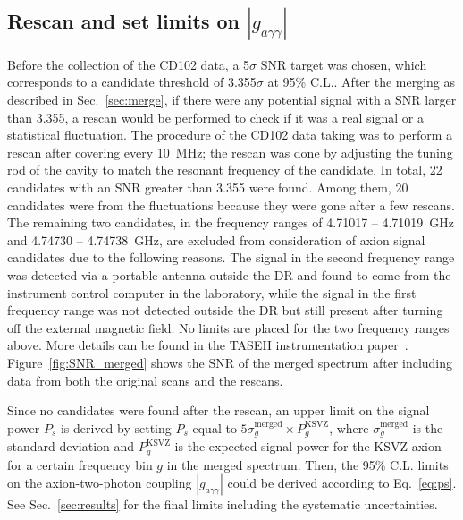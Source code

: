 \documentclass[%
reprint, %
superscriptaddress,
 amsmath,amssymb,
 aps
]{revtex4-2}
\begin{document}
\subsection{Rescan and set limits on $\left|g_{a\gamma\gamma}\right|$}
\label{sec:rescan} 
Before the collection of the CD102 data, a 5$\sigma$ SNR target was chosen, 
which corresponds to a candidate threshold of 3.355$\sigma$ at 95\% C.L..
 After the merging as described in Sec.~\ref{sec:merge}, if there were 
any potential signal with a SNR larger than 
3.355, a rescan would be performed to check if it was a real signal 
or a statistical fluctuation. 
The procedure of the CD102 data taking was to perform a rescan after 
covering every 10~MHz; the rescan was done by adjusting the tuning rod of the 
cavity to match the resonant frequency of the candidate. 
In total, 22 candidates with an SNR greater than 3.355 were found. 
Among them, 20 candidates were from the fluctuations because they were gone 
after a few rescans. The remaining two candidates, 
in the frequency ranges of 4.71017 -- 4.71019~GHz and 4.74730 -- 4.74738~GHz, 
are excluded from consideration of axion signal candidates due to the 
following reasons. 
The signal in the second frequency range 
was detected via a portable antenna outside the DR and found 
to come from the instrument control computer in the laboratory, while the 
signal in the first frequency range 
was not detected outside the DR but 
still present after turning off the external magnetic field. 
No limits are placed for the two frequency ranges above.  
More details can be found in the 
TASEH instrumentation paper~\cite{TASEHInstrumentation}. 
Figure~\ref{fig:SNR_merged} shows the SNR of the merged spectrum after 
including data from both the original scans and the rescans. 

Since no candidates were found after the rescan, an upper limit on 
the signal power $P_s$ is derived by setting $P_s$ equal to 
$5\sigma_{g}^\text{merged}\times P_{g}^\text{KSVZ}$, where 
$\sigma_{g}^\text{merged}$ is the standard deviation 
and $P_{g}^\text{KSVZ}$ is the expected signal power for the KSVZ axion 
for a certain frequency bin $g$ in the merged spectrum. 
Then, the 95\% C.L. limits on the axion-two-photon coupling 
$\left|g_{a\gamma\gamma}\right|$ could be derived according to 
Eq.~\eqref{eq:ps}. 
See Sec.~\ref{sec:results} for the final limits including the systematic 
uncertainties.
\end{document}
